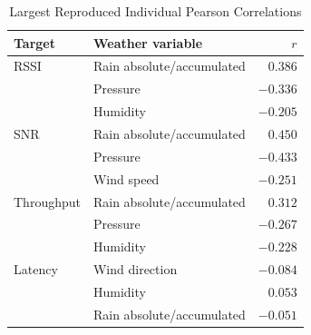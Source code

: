 \begin{table}[t]
\caption{Largest Reproduced Individual Pearson Correlations}
\label{tab:correlations}
\centering
\footnotesize
\begin{tabular}{llr}
\toprule
Target & Weather variable & $r$\\
\midrule
RSSI & Rain absolute/accumulated & $0.386$\\
     & Pressure & $-0.336$\\
     & Humidity & $-0.205$\\
SNR  & Rain absolute/accumulated & $0.450$\\
     & Pressure & $-0.433$\\
     & Wind speed & $-0.251$\\
Throughput & Rain absolute/accumulated & $0.312$\\
     & Pressure & $-0.267$\\
     & Humidity & $-0.228$\\
Latency & Wind direction & $-0.084$\\
     & Humidity & $0.053$\\
     & Rain absolute/accumulated & $-0.051$\\
\bottomrule
\end{tabular}
\end{table}
